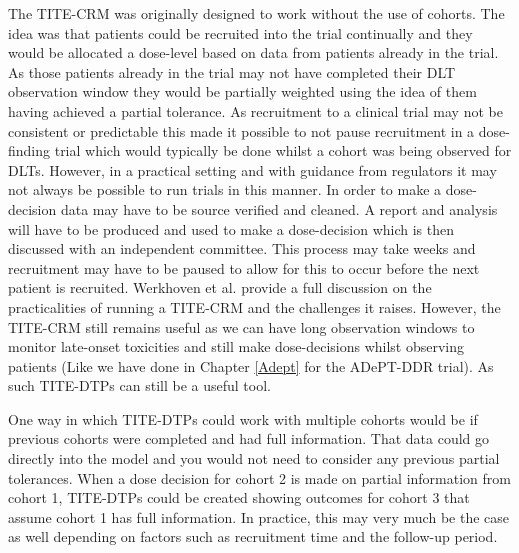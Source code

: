 The TITE-CRM was originally designed to work without the use of cohorts. The idea was that patients could be recruited into the trial continually and they would be allocated a dose-level based on data from patients already in the trial. As those patients already in the trial may not have completed their DLT observation window they would be partially weighted using the idea of them having achieved a partial tolerance. As recruitment to a clinical trial may not be consistent or predictable this made it possible to not pause recruitment in a dose-finding trial which would typically be done whilst a cohort was being observed for DLTs. However, in a practical setting and with guidance from regulators it may not always be possible to run trials in this manner. In order to make a dose-decision data may have to be source verified and cleaned. A report and analysis will have to be produced and  used to make a dose-decision which is then discussed with an independent committee. This process may take weeks and recruitment may have to be paused to allow for this to occur before the next patient is recruited. Werkhoven et al. \cite{vanwerkhovenPracticalitiesRunningEarlyphase2020} provide a full discussion on the practicalities of running a TITE-CRM and the challenges it raises. However, the TITE-CRM still remains useful as we can have long observation windows to monitor late-onset toxicities and still make dose-decisions whilst observing patients (Like we have done in Chapter \ref{Adept} for the ADePT-DDR trial). As such TITE-DTPs can still be a useful tool.

One way in which TITE-DTPs could work with multiple cohorts would be if previous cohorts were completed and had full information. That data could go directly into the model and you would not need to consider any previous partial tolerances. When a dose decision for cohort 2 is made on partial information from cohort 1, TITE-DTPs could be created showing outcomes for cohort 3 that assume cohort 1 has full information. In practice, this may very much be the case as well depending on factors such as recruitment time and the follow-up period. 

